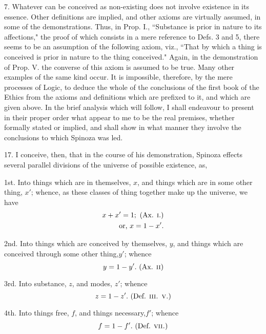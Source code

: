 \documentclass[oneside]{book}
\begin{document}
7. Whatever can be conceived as non-existing does not involve existence in its essence.
Other definitions are implied, and other axioms are virtually
assumed, in some of the demonstrations. Thus, in Prop. I.,
``Substance is prior in nature to its affections," the proof of
which consists in a mere reference to Defs. 3 and 5, there seems
to be an assumption of the following axiom, viz., ``That by which
a thing is conceived is prior in nature to the thing conceived."
Again, in the demonstration of Prop. V. the converse of this
axiom is assumed to be true. Many other examples of the same
kind occur. It is impossible, therefore, by the mere processes of
Logic, to deduce the whole of the conclusions of the first book of
the Ethics from the axioms and definitions which are prefixed to
it, and which are given above. In the brief analysis which will
follow, I shall endeavour to present in their proper order what
appear to me to be the real premises, whether formally stated or
implied, and shall show in what manner they involve the conclusions to which Spinoza was led.

17. I conceive, then, that in the course of his demonstration,
Spinoza effects several parallel divisions of the universe of possible existence, as,

1st. Into things which are in themselves, $x$, and things which
are in some other thing, $x'$; whence, as these classes of thing together make up the universe, we have
\begin{eqnarray*}
              x + x'= 1; \textrm{ (Ax. \textsc{i}.)}\\
  \textrm{or, }         x = 1 - x'.
\end{eqnarray*}

2nd. Into things which are conceived by themselves, $y$, and
things which are conceived through some other thing,$y'$;
whence
\[
  y = 1 - y'. \textrm{ (Ax. \textsc{ii})}
\]

3rd. Into substance, $z$, and modes, $z'$; whence
\[
  z = 1 - z'. \textrm{ (Def. \textsc{iii. v.})}
\]

4th. Into things free, $f$, and things necessary,$f'$; whence
\[
  f = 1 - f'.   \textrm{ (Def. \textsc{vii.})}
\]
\end{document}
